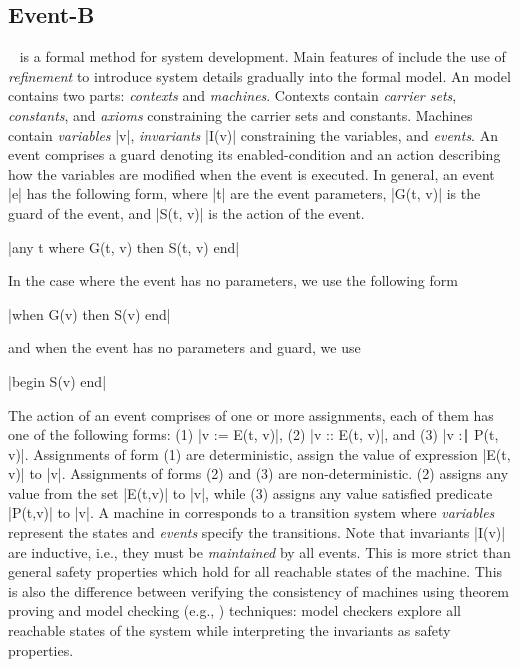 
\subsection{Event-B}
\label{sec:eventb}

\EventB~\cite{abrial10:_model_event_b} is a formal method for system
development.  Main features of \EventB include the use of
\emph{refinement} to introduce system details gradually into the
formal model.  An \EventB model contains two parts: \emph{contexts} and \emph{machines}. Contexts contain \emph{carrier sets}, \emph{constants}, and \emph{axioms} constraining the carrier sets and constants.  Machines contain \emph{variables} |v|, \emph{invariants} |I(v)| constraining the variables, and \emph{events}. An event comprises a guard denoting its enabled-condition and an action describing how the variables are modified when the event is executed.  In general, an event |e| has the following form, where |t| are the event parameters, |G(t, v)| is the guard of the event, and |S(t, v)| is the action of the event.
\begin{center}
  |any t where G(t, v) then S(t, v) end|
\end{center}
In the case where the event has no parameters, we use the following form
\begin{center}
  |when G(v) then S(v) end|
\end{center}
and when the event has no parameters and guard, we use
\begin{center}
  |begin S(v) end|
\end{center}
The action of an event comprises of one or more assignments, each of them has one of the following forms: (1) |v := E(t, v)|, (2) |v :: E(t, v)|, and (3) |v :∣ P(t, v)|.  Assignments of form (1) are deterministic, assign the value of expression |E(t, v)| to |v|.  Assignments of forms (2) and (3) are non-deterministic. (2) assigns any value from the set |E(t,v)| to |v|, while (3) assigns any value satisfied predicate |P(t,v)| to |v|.
A machine in \EventB corresponds to a transition system
where \emph{variables} represent the states and \emph{events} specify
the transitions.  Note that invariants |I(v)| are inductive, i.e., they must be \emph{maintained} by all events. This is more strict than general safety properties which hold for all reachable states of the \EventB machine.  This is also the difference between verifying the consistency of \EventB machines using theorem proving and model checking (e.g., \PROB) techniques: model checkers explore all reachable states of the system while interpreting the invariants as safety properties.  

